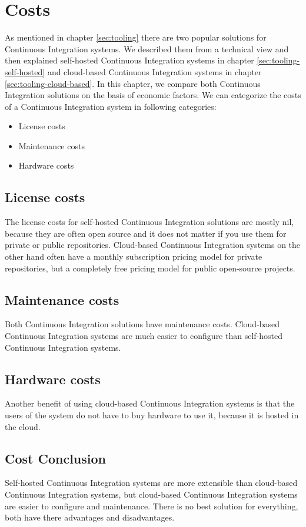 \section{Costs}\label{sec:costs}

As mentioned in chapter \ref{sec:tooling} there are two popular solutions for
Continuous Integration systems.  We described them from a technical view and
then explained self-hosted Continuous Integration systems in chapter
\ref{sec:tooling-self-hosted} and cloud-based Continuous Integration systems in
chapter \ref{sec:tooling-cloud-based}.  In this chapter, we compare both
Continuous Integration solutions on the basis of economic factors.  We can
categorize the costs of a Continuous Integration system in following categories:

\begin{itemize} \item License costs 
    \item Maintenance costs 
    \item Hardware costs
\end{itemize}

\subsection{License costs}

The license costs for self-hosted Continuous Integration solutions are mostly
nil, because they are often open source and it does not matter if you use them
for private or public repositories.  Cloud-based Continuous Integration systems
on the other hand often have a monthly subscription pricing model for private
repositories, but a completely free pricing model for public open-source
projects.

\subsection{Maintenance costs}

Both Continuous Integration solutions have maintenance costs. Cloud-based
Continuous Integration systems are much easier to configure than self-hosted
Continuous Integration systems.

\subsection{Hardware costs}

Another benefit of using cloud-based Continuous
Integration systems is that the users of the system do not have to buy hardware
to use it, because it is hosted in the cloud.

\subsection{Cost Conclusion}

Self-hosted Continuous Integration systems are more extensible than cloud-based
Continuous Integration systems, but cloud-based Continuous Integration systems
are easier to configure and maintenance. There is no best solution for
everything, both have there advantages and disadvantages.
